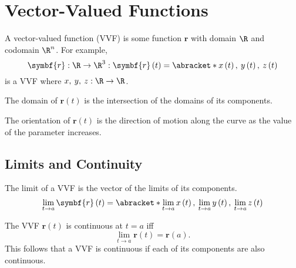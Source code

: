 \documentclass{article}
\begin{document}
\section{Vector-Valued Functions}
\begin{definition}
    A vector-valued function (VVF) is some function \(\symbf{r}\) with
    domain \(\R\) and codomain \(\R^n\). For example,
    \begin{equation*}
        \symbf{r}:\R\to\R^3
        :\symbf{r}\left( t \right)=\abracket*{x\left( t \right),\: y\left( t \right),\: z\left( t \right)}
    \end{equation*}
    is a VVF where \(x,\:y,\:z: \R\to\R\).
\end{definition}
\begin{theorem}
    The domain of \(\symbf{r}\left( t \right)\) is the intersection of the domains of
    its components.
\end{theorem}
\begin{definition}[Orientation]
    The orientation of \(\symbf{r}\left( t \right)\) is the direction of motion along
    the curve as the value of the parameter increases.
\end{definition}
\subsection{Limits and Continuity}
\begin{theorem}
    The limit of a VVF is the vector of the limits of its components.
    \begin{equation*}
        \lim_{t\to a} \symbf{r}\left( t \right)
        = \abracket*{\lim_{t\to a} x\left( t \right),\: \lim_{t\to a} y\left( t \right),\: \lim_{t\to a} z\left( t \right)}
    \end{equation*}
\end{theorem}
\begin{theorem}
    The VVF \(\symbf{r}\left( t \right)\) is continuous at \(t=a\) iff
    \begin{equation*}
        \lim_{t\to a} \symbf{r}\left( t \right) = \symbf{r}\left( a \right).
    \end{equation*}
    This follows that a VVF is continuous if each of its components are
    also continuous.
\end{theorem}
\end{document}
